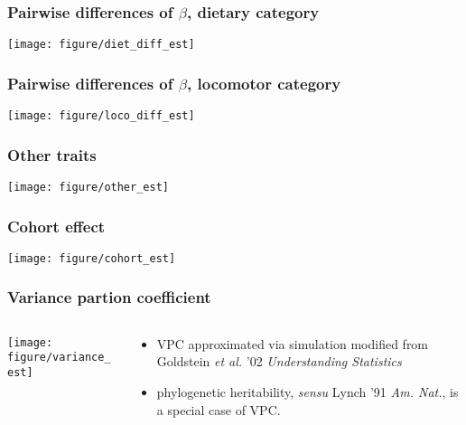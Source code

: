 \documentclass{beamer}
\begin{document}
\begin{frame}
  \frametitle{Pairwise differences of \(\beta\), dietary category}
  \begin{center}
    \texttt{[image: figure/diet\_diff\_est]}
  \end{center}
\end{frame}

\begin{frame}
  \frametitle{Pairwise differences of \(\beta\), locomotor category}
  \begin{center}
    \texttt{[image: figure/loco\_diff\_est]}
  \end{center}
\end{frame}

\begin{frame}
  \frametitle{Other traits}
  \begin{center}
    \texttt{[image: figure/other\_est]}
  \end{center}
\end{frame}

\begin{frame}
  \frametitle{Cohort effect}
  \begin{center}
    \texttt{[image: figure/cohort\_est]}
  \end{center}
\end{frame}

\begin{frame}
  \frametitle{Variance partion coefficient}
  \begin{columns}
    \begin{column}{0.5\textwidth}
      \begin{center}
        \texttt{[image: figure/variance\_est]}
      \end{center}
    \end{column}
    \begin{column}{0.5\textwidth}
      \begin{itemize}
        \item VPC approximated via simulation modified from Goldstein \textit{et al.} '02 \textit{Understanding Statistics}
        \item phylogenetic heritability, \textit{sensu} Lynch '91 \textit{Am. Nat.}, is a special case of VPC.
      \end{itemize}
    \end{column}
  \end{columns}
\end{frame}
\end{document}
